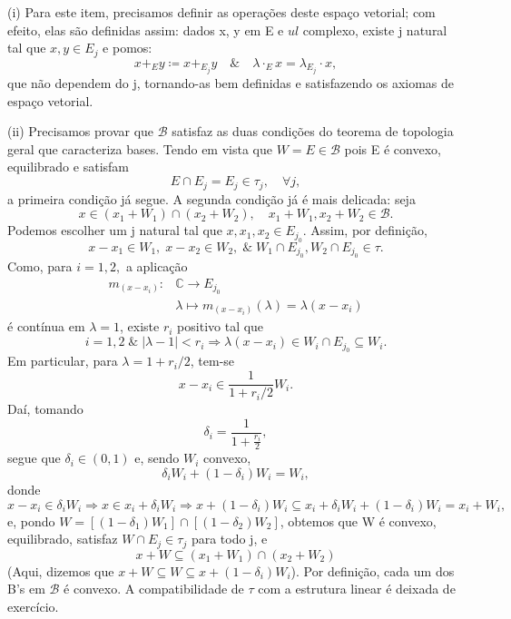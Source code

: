 \documentclass[../distribution_theory_notes.tex]{subfiles}
\begin{document}
\begin{proof*}
  (i) Para este item, precisamos definir as operações deste espaço vetorial; com efeito, elas são definidas assim: dados x, y em E e \( ul\) complexo, existe j natural tal que \(x, y\in E_{j}\) e pomos: 
    \[
      x+_{E}y\coloneqq x +_{E_{j}}y \quad\&\quad \lambda \cdot_{E} x = \lambda_{E_{j}} \cdot x,
    \]
    que não dependem do j, tornando-as bem definidas e satisfazendo os axiomas de espaço vetorial. 

    (ii) Precisamos provar que \(\mathcal{B}\) satisfaz as duas condições do teorema de topologia geral que caracteriza bases. Tendo em vista que \(W=E\in \mathcal{B}\) pois E é convexo, equilibrado e satisfam 
      \[
        E\cap E_{j}=E_{j}\in \tau_{j},\quad \forall j,
      \]
      a primeira condição já segue. A segunda condição já é mais delicada: seja 
        \[
          x\in (x_1+W_{1})\cap (x_2+W_2), \quad x_1+W_1, x_2+W_2\in \mathcal{B}.
        \]
        Podemos escolher um j natural tal que \(x, x_1, x_2\in E_{j_{0}}\). Assim, por definição, 
          \[
            x-x_1\in W_1,\; x-x_2\in W_2, \;\&\; W_1\cap E_{j_{0}}, W_2\cap E_{j_{0}}\in \tau.
          \]
          Como, para \(i=1, 2,\) a aplicação 
         \begin{align*}
          m_{(x-x_{i})}:&\mathbb{C}\rightarrow E_{j_{0}}\\ 
                        &\lambda \mapsto m_{(x-x_{i})}(\lambda )=\lambda (x-x_{i})
         \end{align*}
         é contínua em \(\lambda =1\), existe \(r_{i}\) positivo tal que 
           \[
             i=1,2 \;\&\; |\lambda -1|<r_{i} \Rightarrow \lambda (x-x_{i})\in W_{i}\cap E_{j_{0}}\subseteq W_{i}.
           \]
Em particular, para \(\lambda  = 1 + r_{i}/2\), tem-se 
    \[
      x-x_{i}\in \frac{1}{1+r_{i}/2}W_{i}.
    \]
    Daí, tomando 
      \[
        \delta_{i}=\frac{1}{1+\frac{r_{i}}{2}}, 
      \]
      segue que \(\delta_{i}\in (0, 1)\) e, sendo \(W_{i}\) convexo, 
        \[
          \delta_{i} W_{i} + (1-\delta_{i})W_{i}=W_{i},
        \]
        donde 
          \[
            x-x_{i}\in \delta_{i}W_{i} \Rightarrow x\in x_{i}+\delta_{i}W_{i}\Rightarrow x+(1-\delta_{i})W_{i}\subseteq x_{i}+\delta_{i}W_{i}+(1-\delta_{i})W_{i} = x_{i}+W_{i},
          \]
          e, pondo \(W=[(1-\delta_{1})W_1]\cap [(1-\delta_2)W_2]\), obtemos que W é convexo, equilibrado, satisfaz \(W\cap E_{j}\in \tau_{j}\) para todo j, e 
            \[
              x+W\subseteq (x_1+W_1)\cap (x_2+W_2)
            \]
            (Aqui, dizemos que \(x+W\subseteq W\subseteq x+(1-\delta_{i})W_{i}\)). Por definição, cada um dos B's em \(\mathcal{B}\) é convexo. A compatibilidade de \(\tau \) com a estrutura linear é deixada de exercício.


\end{proof*}
\end{document}
